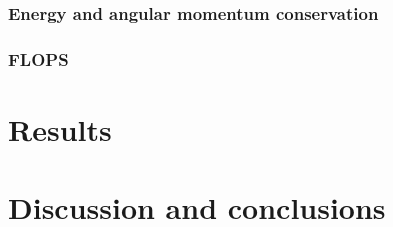 \documentclass[10pt]{article}
\begin{document}
\begin{multicols}{2}
\subsubsection{Energy and angular momentum conservation}
\subsubsection{FLOPS}

\section{Results}

\section{Discussion and conclusions}
{}


\end{multicols}
\end{document}
